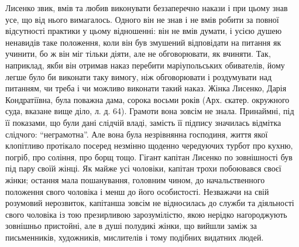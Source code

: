 \documentclass[a4paper,20pt]{report}
\begin{document}
Лисенко звик, вмів та любив виконувати беззаперечно накази і при цьому знав усе, що від нього вимагалось.
Одного він не знав і не вмів робити за повної відсутності практики у цьому відношенні: він не вмів думати,
і усією душею ненавидів таке положення, коли він був змушений відповідати на питання як учинити,
бо ж він міг тільки діяти, але не обговорювати, як вчиняти. Так, наприклад, якби він отримав наказ перебити
маріупольських обивателів, йому легше було би виконати таку вимогу, ніж обговорювати і роздумувати над питанням,
чи треба і чи можливо виконати такий наказ.
Жінка Лисенко, Дарія Кондратіївна, була поважна дама, сорока восьми років (Арх.
єкатер. окружного суда, вказане вище діло, л. д. 64). Грамоти вона зовсім не
знала. Принаймні, під її показами, що були дані слідчій владі, замість її
підпису значилась відмітка слідчого: ``неграмотна''. Але вона була незрівнянна
господиня, життя якої клопітливо протікало посеред незмінно щоденно чередуючих
турбот про кухню, погріб, про соління, про борщ тощо. Гігант капітан Лисенко по
зовнішності був під пару своїй жінці.  Як майже усі чоловіки, капітан трохи
побоювався своєї жінки; остання мала пошанування, головним чином, до
начальственного положення свого чоловіка і менш до його особистості. Незважачи
на свій розумовий нерозвиток, капітанша зовсім не відносилась до служби та
діяльності свого чоловіка із тою презирливою зарозумілістю, якою нерідко
нагороджують зовнішньо пристойні, але в душі полудикі жінки, що вийшли заміж за
письменників, художників, мислителів і тому подібних видатних людей.
\end{document}
